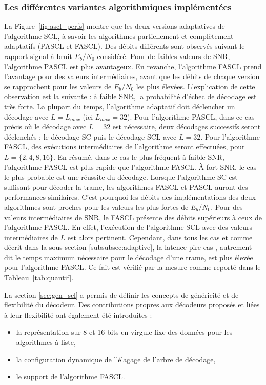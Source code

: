 \subsubsection{Les différentes variantes algorithmiques implémentées}
La Figure~\ref{fig:ascl_perfs} montre que les deux versions adaptatives de l'algorithme SCL, à savoir les algorithmes partiellement et complètement adaptatifs (PASCL et FASCL). Des débits différents sont observés suivant le rapport signal à bruit $E_b/N_0$ considéré. Pour de faibles valeurs de SNR, l'algorithme PASCL est plus avantageux. En revanche, l'algorithme FASCL prend l'avantage pour des valeurs intermédiaires, avant que les débits de chaque version se rapprochent pour les valeurs de $E_b/N_0$ les plus élevées.
L'explication de cette observation est la suivante : à faible SNR, la probabilité d'échec de décodage est très forte. La plupart du temps, l'algorithme adaptatif doit déclencher un décodage avec $L=L_{max}$ (ici $L_{max}=32$). Pour l'algorithme PASCL, dans ce cas précis où le décodage avec $L=32$ est nécessaire, deux décodages successifs seront déclenchés : le décodage SC puis le décodage SCL avec $L=32$. Pour l'algorithme FASCL, des exécutions intermédiaires de l'algorithme seront effectuées, pour $L=\{2,4,8,16\}$. En résumé, dans le cas le plus fréquent à faible SNR, l'algorithme PASCL est plus rapide que l'algorithme FASCL.
\`A fort SNR, le cas le plus probable est une réussite du décodage. Lorsque l'algorithme SC est suffisant pour décoder la trame, les algorithmes FASCL et PASCL auront des performances similaires. C'est pourquoi les débits des implémentations des deux algorithmes sont proches pour les valeurs les plus fortes de $E_b/N_0$. Pour des valeurs intermédiaires de SNR, le FASCL présente des débits supérieurs à ceux de l'algorithme PASCL. En effet, l'exécution de l'algorithme SCL avec des valeurs intermédiaires de $L$ est alors pertinent. Cependant, dans tous les cas et comme décrit dans la sous-section \ref{subsubsec:adaptive}, la latence \og pire cas \fg, autrement dit le temps maximum nécessaire pour le décodage d'une trame, est plus élevée pour l'algorithme FASCL. Ce fait est vérifié par la mesure comme reporté dans le Tableau~\ref{tab:quantif}.

La section \ref{sec:gen_scl} a permis de définir les concepts de généricité et de flexibilité du décodeur. Des contributions propres aux décodeurs proposés et liées à leur flexibilité ont également été introduites :

\begin{itemize}
  \item la représentation sur 8 et 16 bits en virgule fixe des données pour les algorithmes à liste,
  \item la configuration dynamique de l'élagage de l'arbre de décodage,
  \item le support de l'algorithme FASCL.
\end{itemize}

